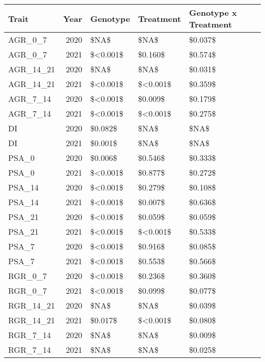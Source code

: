 \captionsetup[table]{labelformat=empty,skip=1pt}
\begin{longtable}{lrlll}
\toprule
Trait & Year & Genotype & Treatment & Genotype x Treatment \\ 
\midrule
AGR\_0\_7 & 2020 & \$NA\$ & \$NA\$ & \$0.037\$ \\ 
AGR\_0\_7 & 2021 & \$<0.001\$ & \$0.160\$ & \$0.574\$ \\ 
AGR\_14\_21 & 2020 & \$NA\$ & \$NA\$ & \$0.031\$ \\ 
AGR\_14\_21 & 2021 & \$<0.001\$ & \$<0.001\$ & \$0.359\$ \\ 
AGR\_7\_14 & 2020 & \$<0.001\$ & \$0.009\$ & \$0.179\$ \\ 
AGR\_7\_14 & 2021 & \$<0.001\$ & \$<0.001\$ & \$0.275\$ \\ 
DI & 2020 & \$0.082\$ & \$NA\$ & \$NA\$ \\ 
DI & 2021 & \$0.001\$ & \$NA\$ & \$NA\$ \\ 
PSA\_0 & 2020 & \$0.006\$ & \$0.546\$ & \$0.333\$ \\ 
PSA\_0 & 2021 & \$<0.001\$ & \$0.877\$ & \$0.272\$ \\ 
PSA\_14 & 2020 & \$<0.001\$ & \$0.279\$ & \$0.108\$ \\ 
PSA\_14 & 2021 & \$<0.001\$ & \$0.007\$ & \$0.636\$ \\ 
PSA\_21 & 2020 & \$<0.001\$ & \$0.059\$ & \$0.059\$ \\ 
PSA\_21 & 2021 & \$<0.001\$ & \$<0.001\$ & \$0.533\$ \\ 
PSA\_7 & 2020 & \$<0.001\$ & \$0.916\$ & \$0.085\$ \\ 
PSA\_7 & 2021 & \$<0.001\$ & \$0.553\$ & \$0.566\$ \\ 
RGR\_0\_7 & 2020 & \$<0.001\$ & \$0.236\$ & \$0.360\$ \\ 
RGR\_0\_7 & 2021 & \$<0.001\$ & \$0.099\$ & \$0.077\$ \\ 
RGR\_14\_21 & 2020 & \$NA\$ & \$NA\$ & \$0.039\$ \\ 
RGR\_14\_21 & 2021 & \$0.017\$ & \$<0.001\$ & \$0.080\$ \\ 
RGR\_7\_14 & 2020 & \$NA\$ & \$NA\$ & \$0.009\$ \\ 
RGR\_7\_14 & 2021 & \$NA\$ & \$NA\$ & \$0.025\$ \\ 
\bottomrule
\end{longtable}

